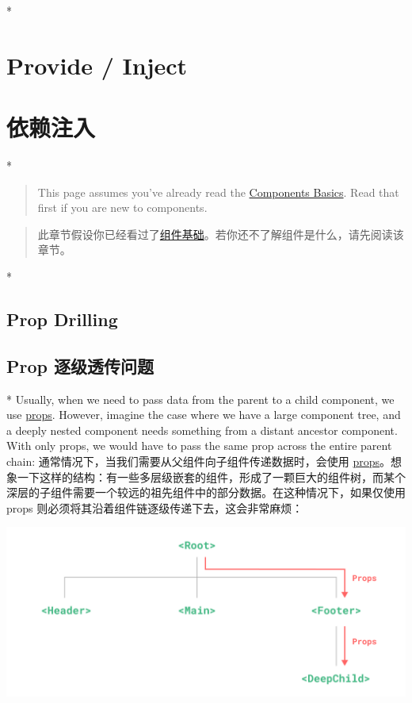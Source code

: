 \begin{paracol}{2}
\switchcolumn[0]*%
\section{Provide / Inject}
\switchcolumn
\section{依赖注入}
\switchcolumn[0]*%
\begin{quote}
This page assumes you've already read the
\href{https://vuejs.org/guide/essentials/component-basics.html}{Components
Basics}. Read that first if you are new to components.
\end{quote}
\switchcolumn
\begin{quote}
此章节假设你已经看过了\href{https://cn.vuejs.org/guide/essentials/component-basics.html}{组件基础}。若你还不了解组件是什么，请先阅读该章节。
\end{quote}
\switchcolumn[0]*%
\subsection{Prop Drilling}
\switchcolumn
\subsection{Prop 逐级透传问题}
\switchcolumn[0]*%
Usually, when we need to pass data from the parent to a child component,
we use \href{https://vuejs.org/guide/components/props.html}{props}.
However, imagine the case where we have a large component tree, and a
deeply nested component needs something from a distant ancestor
component. With only props, we would have to pass the same prop across
the entire parent chain:
\switchcolumn
通常情况下，当我们需要从父组件向子组件传递数据时，会使用
\href{https://cn.vuejs.org/guide/components/props.html}{props}。想象一下这样的结构：有一些多层级嵌套的组件，形成了一颗巨大的组件树，而某个深层的子组件需要一个较远的祖先组件中的部分数据。在这种情况下，如果仅使用
props 则必须将其沿着组件链逐级传递下去，这会非常麻烦：
\end{paracol}

\begin{center} 
\includegraphics{./img/prop-drilling.11201220.png} 
\end{center}

